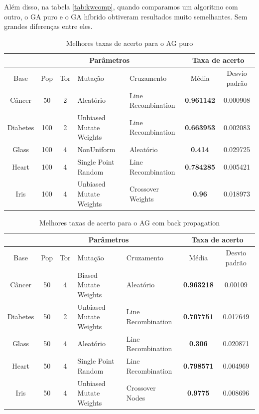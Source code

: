 \documentclass[12pt]{article}
\begin{document}
Além disso, na tabela \ref{tab:kwcomp}, quando comparamos um algoritmo com outro, o GA puro e o GA híbrido obtiveram resultados muito semelhantes. Sem grandes diferenças entre eles.


\begin{table}[hp]
\center
\begin{tabular}{c|c|c|p{3cm}|p{3cm}|c|c|}
\cline{2-7}
&  \multicolumn{4}{|c|}{Parâmetros} & \multicolumn{2}{|c|}{Taxa de acerto} \\ \hline
\multicolumn{1}{|c|}{Base} & Pop & Tor & Mutação & Cruzamento & Média & Desvio padrão  \\ \hline
\multicolumn{1}{|c|}{Câncer} & 50 & 2 & Aleatório & Line Recombination & \textbf{0.961142} & 0.000908 \\ \hline
\multicolumn{1}{|c|}{Diabetes} & 100 & 2 & Unbiased Mutate Weights & Line Recombination & \textbf{0.663953} & 0.002083 \\ \hline
\multicolumn{1}{|c|}{Glass} & 100 & 4 & NonUniform & Aleatório & \textbf{0.414} & 0.029725 \\ \hline 
\multicolumn{1}{|c|}{Heart} & 100 & 4 & Single Point Random & Line Recombination & \textbf{0.784285} & 0.005421 \\ \hline
\multicolumn{1}{|c|}{Iris} & 100 & 4 & Unbiased Mutate Weights & Crossover Weights & \textbf{0.96} & 0.018973 \\ \hline
\end{tabular}
\caption{Melhores taxas de acerto para o AG puro}
\label{tab:hitbest}
\end{table}

\begin{table}[hp]
\center
\begin{tabular}{c|c|c|p{3cm}|p{3cm}|c|c|}
\cline{2-7}
&  \multicolumn{4}{|c|}{Parâmetros} & \multicolumn{2}{|c|}{Taxa de acerto} \\ \hline
\multicolumn{1}{|c|}{Base} & Pop & Tor & Mutação & Cruzamento & Média & Desvio padrão  \\ \hline
\multicolumn{1}{|c|}{Câncer} & 50 & 4 & Biased Mutate Weights & Aleatório & \textbf{0.963218} & 0.00109 \\ \hline
\multicolumn{1}{|c|}{Diabetes} & 50 & 2 & Unbiased Mutate Weights & Line Recombination & \textbf{0.707751} & 0.017649 \\ \hline
\multicolumn{1}{|c|}{Glass} & 50 & 4 & Aleatório & Line Recombination & \textbf{0.306} & 0.020871 \\ \hline 
\multicolumn{1}{|c|}{Heart} & 50 & 4 & Single Point Random & Line Recombination & \textbf{0.798571} & 0.004969 \\ \hline
\multicolumn{1}{|c|}{Iris} & 50 & 4 & Unbiased Mutate Weights & Crossover Nodes & \textbf{0.9775} & 0.008696 \\ \hline
\end{tabular}
\caption{Melhores taxas de acerto para o AG com back propagation}
\label{tab:hitbest2}
\end{table}
\end{document}
